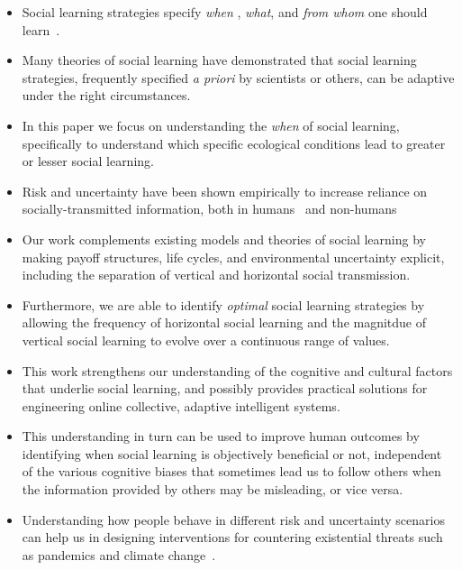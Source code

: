 \documentclass[10pt,letterpaper]{article}
\begin{document}
  \begin{itemize}
    \item 
      Social learning strategies specify \emph{when} , \emph{what}, and 
      \emph{from whom} one should learn~\cite{Laland2004,Kendal2018}.
    \item
      Many theories of social learning have demonstrated that social learning
      strategies, frequently specified \emph{a priori} by scientists or 
      others, can be adaptive under the right circumstances.
    \item
      In this paper we focus on understanding the \emph{when} of social learning, 
      specifically to understand which specific ecological conditions lead to greater or
      lesser social learning.
    \item
      Risk and uncertainty have been shown empirically to increase reliance on 
      socially-transmitted information, both in humans~\cite{Morgan2012,Mesoudi2014,Morgan2015}
      and non-humans~\cite{Carlier1997,Haun2012,Aplin2013,Aplin2015,Farine2015,Jones2015,Leris2016}
    \item
      Our work complements existing models and theories of social learning by 
      making payoff structures, life cycles, and environmental uncertainty 
      explicit, including the separation of vertical and horizontal social transmission.
    \item
      Furthermore, we are able to identify \emph{optimal} social learning strategies
      by allowing the frequency of horizontal social learning and the magnitdue
      of vertical social learning to evolve over a continuous range of values.
    \item
      This work strengthens our understanding of the cognitive and cultural factors
      that underlie social learning, and possibly provides practical solutions
      for engineering online collective, adaptive intelligent systems.
    \item
      This understanding in turn can be used to improve human outcomes by 
      identifying when social learning is objectively beneficial or not, independent
      of the various cognitive biases that sometimes lead us to follow others when 
      the information provided by others may be misleading, or vice versa.
    \item
      Understanding how people behave in different risk and uncertainty
      scenarios can help us in designing interventions for countering
      existential threats such as pandemics and climate change~\cite{Jones2021}.
  \end{itemize}
\end{document}
